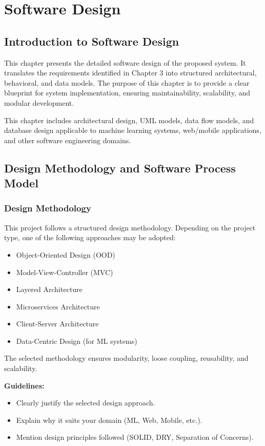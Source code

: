 \chapter{Software Design}

\section{Introduction to Software Design}

This chapter presents the detailed software design of the proposed system. It translates the requirements identified in Chapter 3 into structured architectural, behavioral, and data models. The purpose of this chapter is to provide a clear blueprint for system implementation, ensuring maintainability, scalability, and modular development.

This chapter includes architectural design, UML models, data flow models, and database design applicable to machine learning systems, web/mobile applications, and other software engineering domains.

\section{Design Methodology and Software Process Model}

\subsection{Design Methodology}

This project follows a structured design methodology. Depending on the project type, one of the following approaches may be adopted:

\begin{itemize}
    \item Object-Oriented Design (OOD)
    \item Model-View-Controller (MVC)
    \item Layered Architecture
    \item Microservices Architecture
    \item Client-Server Architecture
    \item Data-Centric Design (for ML systems)
\end{itemize}

The selected methodology ensures modularity, loose coupling, reusability, and scalability.

\textbf{Guidelines:}
\begin{itemize}
    \item Clearly justify the selected design approach.
    \item Explain why it suits your domain (ML, Web, Mobile, etc.).
    \item Mention design principles followed (SOLID, DRY, Separation of Concerns).
\end{itemize}

